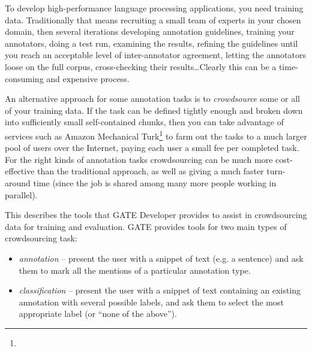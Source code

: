 %
%
%


\nnormalsize

To develop high-performance language processing applications, you need training
data. Traditionally that means recruiting a small team of experts in your
chosen domain, then several iterations developing annotation guidelines,
training your annotators, doing a test run, examining the results, refining the
guidelines until you reach an acceptable level of inter-annotator agreement,
letting the annotators loose on the full corpus, cross-checking their
results\ldots  Clearly this can be a time-consuming and expensive process.

An alternative approach for some annotation tasks is to \emph{crowdsource} some
or all of your training data. If the task can be defined tightly enough and
broken down into sufficiently small self-contained chunks, then you can take
advantage of services such as Amazon Mechanical
Turk\footnote{} to farm out the tasks to a
much larger pool of users over the Internet, paying each user a small fee per
completed task.  For the right kinds of annotation tasks crowdsourcing can be
much more cost-effective than the traditional approach, as well as giving a
much faster turn-around time (since the job is shared among many more people
working in parallel).

This \chapthing{} describes the tools that GATE Developer provides to assist in
crowdsourcing data for training and evaluation.  GATE provides tools for two
main types of crowdsourcing task:

\begin{itemize}
\item \emph{annotation} -- present the user with a snippet of text (e.g.
  a sentence) and ask them to mark all the mentions of a particular annotation
  type.
\item \emph{classification} -- present the user with a snippet of text
  containing an existing annotation with several possible labels, and ask them
  to select the most appropriate label (or ``none of the above'').
\end{itemize}

